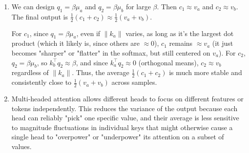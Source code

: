 \begin{answer}
\begin{enumerate}[label=(\alph*)]
        \item 
        \begin{subparts}
            \subpart We can design $q_1 = \beta \mu_a$ and $q_2 = \beta \mu_b$ for large $\beta$. Then $c_1 \approx v_a$ and $c_2 \approx v_b$. The final output is $\frac{1}{2}(c_1 + c_2) \approx \frac{1}{2}(v_a + v_b)$.
            
            \subpart For $c_1$, since $q_1 = \beta \mu_a$, even if $\|k_a\|$ varies, as long as it's the largest dot product (which it likely is, since others are $\approx 0$), $c_1$ remains $\approx v_a$ (it just becomes "sharper" or "flatter" in the softmax, but still centered on $v_a$). For $c_2$, $q_2 = \beta \mu_b$, so $k_b^\top q_2 \approx \beta$, and since $k_a^\top q_2 \approx 0$ (orthogonal means), $c_2 \approx v_b$ regardless of $\|k_a\|$. Thus, the average $\frac{1}{2}(c_1 + c_2)$ is much more stable and consistently close to $\frac{1}{2}(v_a + v_b)$ across samples.
        \end{subparts}

        \item Multi-headed attention allows different heads to focus on different features or tokens independently. This reduces the variance of the output because each head can reliably "pick" one specific value, and their average is less sensitive to magnitude fluctuations in individual keys that might otherwise cause a single head to "overpower" or "underpower" its attention on a subset of values.
    \end{enumerate}
\end{answer}